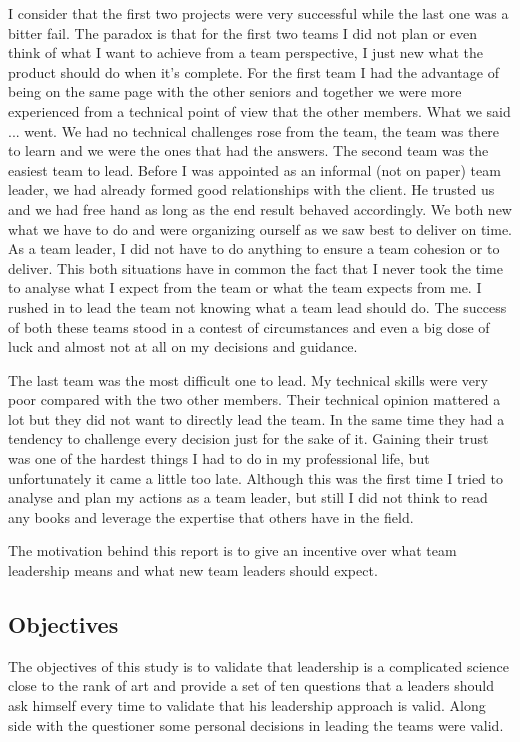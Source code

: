 I consider that the first two projects were very successful while the last one was a bitter fail. The paradox is that for the first two teams I did not plan or even think of what I want to achieve from a team perspective, I just new what the product should do when it's complete. For the first team I had the advantage of being on the same page with the other seniors and together we were more experienced from a technical point of view that the other members. What we said ... went. We had no technical challenges rose from the team, the team was there to learn and we were the ones that had the answers. The second team was the easiest team to lead. Before I was appointed as an informal (not on paper) team leader, we had already formed good relationships with the client. He trusted us and we had free hand as long as the end result behaved accordingly. We both new what we have to do and were organizing ourself as we saw best to deliver on time. As a team leader, I did not have to do anything to ensure a team cohesion or to deliver. This both situations have in common the fact that I never took the time to analyse what I expect from the team or what the team  expects from me. I rushed in to lead the team not knowing what a team lead should do. The success of both these teams stood in a contest of circumstances and even a big dose of luck and almost not at all on my decisions and guidance.

The last team was the most difficult one to lead. My technical skills were very poor compared with the two other members. Their technical opinion mattered a lot but they did not want to directly lead the team. In the same time they had a tendency to challenge every decision just for the sake of it. Gaining their trust was one of the hardest things I had to do in my professional life, but unfortunately it came a little too late. Although this was the first time I tried to analyse and plan my actions as a team leader, but still I did not think to read any books and leverage the expertise that others have in the field.

The motivation behind this report is to give an incentive over what team leadership means and what new team leaders should expect.

\subsection{Objectives}
\label{sub-sec:objectives}

The objectives of this study is to validate that leadership is a complicated science close to the rank of art and provide a set of ten questions that a leaders should ask himself every time to validate that his leadership approach is valid. 
Along side with the questioner some personal decisions in leading the teams were valid.